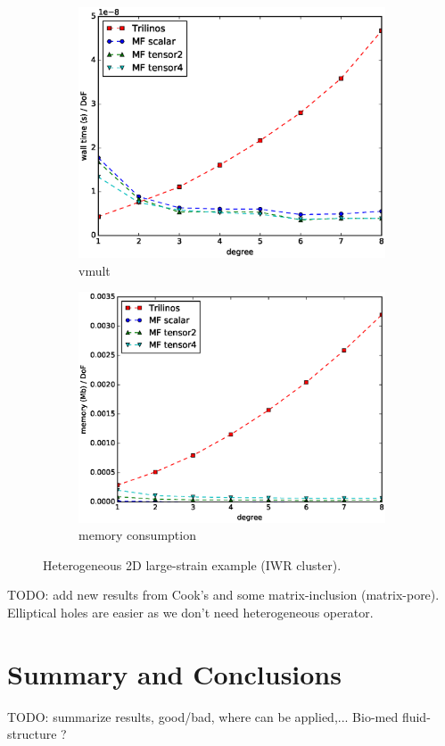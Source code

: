 \documentclass[preprint,12pt,times]{elsarticle}
\begin{document}
\begin{figure}[!ht]
  \centering
  \begin{subfigure}[b]{0.49\textwidth}
      \centering
      \includegraphics[width=\textwidth]{IWR_timing.eps}
      \caption{vmult}
  \end{subfigure}
  \begin{subfigure}[b]{0.49\textwidth}
      \centering
      \includegraphics[width=\textwidth]{IWR_memory.eps}
      \caption{memory consumption}
  \end{subfigure}
  \caption{Heterogeneous 2D large-strain example (IWR cluster).}%
  \label{fig:benchmark_2d_miehe_IWR}
\end{figure}


TODO: add new results from Cook's and some matrix-inclusion (matrix-pore).
Elliptical holes are easier as we don't need heterogeneous operator.

\section{Summary and Conclusions}

TODO: summarize results, good/bad, where can be applied,...
Bio-med fluid-structure ?



\end{document}
